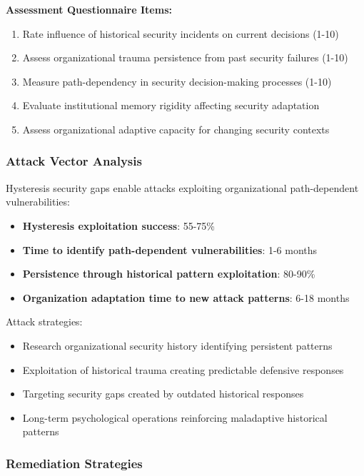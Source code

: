 \documentclass[11pt,a4paper]{article}
\begin{document}
\textbf{Assessment Questionnaire Items:}
\begin{enumerate}
\item Rate influence of historical security incidents on current decisions (1-10)
\item Assess organizational trauma persistence from past security failures (1-10)
\item Measure path-dependency in security decision-making processes (1-10)
\item Evaluate institutional memory rigidity affecting security adaptation
\item Assess organizational adaptive capacity for changing security contexts
\end{enumerate}

\subsubsection{Attack Vector Analysis}

Hysteresis security gaps enable attacks exploiting organizational path-dependent vulnerabilities:

\begin{itemize}
\item \textbf{Hysteresis exploitation success}: 55-75\%
\item \textbf{Time to identify path-dependent vulnerabilities}: 1-6 months
\item \textbf{Persistence through historical pattern exploitation}: 80-90\%
\item \textbf{Organization adaptation time to new attack patterns}: 6-18 months
\end{itemize}

Attack strategies:
\begin{itemize}
\item Research organizational security history identifying persistent patterns
\item Exploitation of historical trauma creating predictable defensive responses
\item Targeting security gaps created by outdated historical responses
\item Long-term psychological operations reinforcing maladaptive historical patterns
\end{itemize}

\subsubsection{Remediation Strategies}
\end{document}
